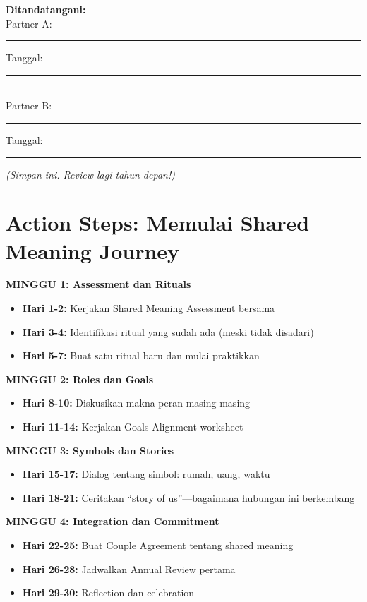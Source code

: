 \begin{exercisebox}
\vspace{0.5cm}
\textbf{Ditandatangani:}\\
Partner A: \rule{5cm}{0.4pt} Tanggal: \rule{3cm}{0.4pt}\\
Partner B: \rule{5cm}{0.4pt} Tanggal: \rule{3cm}{0.4pt}

\vspace{0.5cm}
\textit{(Simpan ini. Review lagi tahun depan!)}
\end{exercisebox}

\section{Action Steps: Memulai Shared Meaning Journey}

\begin{exercisebox}

\textbf{MINGGU 1: Assessment dan Rituals}
\begin{itemize}
    \item \textbf{Hari 1-2:} Kerjakan Shared Meaning Assessment bersama
    \item \textbf{Hari 3-4:} Identifikasi ritual yang sudah ada (meski tidak disadari)
    \item \textbf{Hari 5-7:} Buat satu ritual baru dan mulai praktikkan
\end{itemize}

\textbf{MINGGU 2: Roles dan Goals}
\begin{itemize}
    \item \textbf{Hari 8-10:} Diskusikan makna peran masing-masing
    \item \textbf{Hari 11-14:} Kerjakan Goals Alignment worksheet
\end{itemize}

\textbf{MINGGU 3: Symbols dan Stories}
\begin{itemize}
    \item \textbf{Hari 15-17:} Dialog tentang simbol: rumah, uang, waktu
    \item \textbf{Hari 18-21:} Ceritakan ``story of us''---bagaimana hubungan ini berkembang
\end{itemize}

\textbf{MINGGU 4: Integration dan Commitment}
\begin{itemize}
    \item \textbf{Hari 22-25:} Buat Couple Agreement tentang shared meaning
    \item \textbf{Hari 26-28:} Jadwalkan Annual Review pertama
    \item \textbf{Hari 29-30:} Reflection dan celebration
\end{itemize}
\end{exercisebox}

